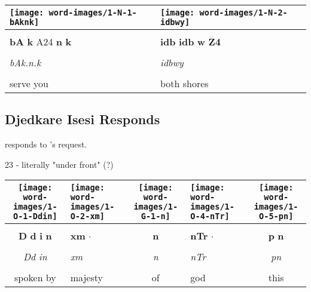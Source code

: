 \vspace{7.5mm}

\begin{tabularx}{\linewidth}{YY}
	\texttt{[image: word-images/1-N-1-bAknk]} &
	\texttt{[image: word-images/1-N-2-idbwy]} \\
	\hline \\ 
	\textbf{bA} \textbf{k} A24 \textbf{n} \textbf{k} &
	\textbf{idb} \textbf{idb} \textbf{w} \textbf{Z4} \\
	\hline \\ 
	\textit{bAk.n.k} & \textit{idbwy} \\
	\hline \\ 
	serve you & both shores
\end{tabularx}

\vspace*{\fill}

\pagebreak

\subsection*{Djedkare Isesi Responds}

\vspace*{\fill}

 responds to 's request.

\vspace*{\fill}

23 - literally "under front" (?)

\vspace*{\fill}

\pagebreak


\vspace*{\fill}

\begin{tabularx}{\linewidth}{cYcYc}
	\texttt{[image: word-images/1-O-1-Ddin]} &
	\texttt{[image: word-images/1-O-2-xm]} &
	\texttt{[image: word-images/1-G-1-n]} &
	\texttt{[image: word-images/1-O-4-nTr]} &
	\texttt{[image: word-images/1-O-5-pn]} \\
	\hline \\ 
	\textbf{D} \textbf{d} \textbf{i} \textbf{n} &
	\textbf{xm} $\cdot$ &
	\textbf{n} &
	\textbf{nTr} $\cdot$ &
	\textbf{p} \textbf{n} \\
	\hline \\ 
	\textit{Dd in} & \textit{xm} & \textit{n} & \textit{nTr} & \textit{pn} \\
	\hline \\ 
	spoken by & majesty & of & god & this
\end{tabularx}

